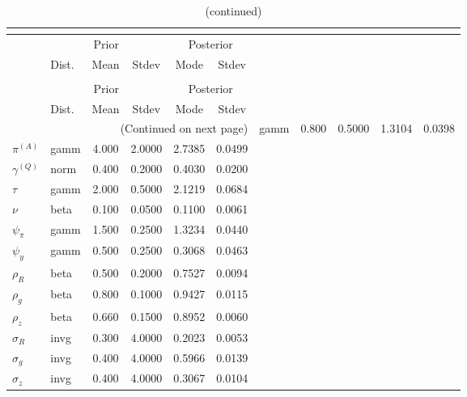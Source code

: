  
\begin{center}
\begin{longtable}{llcccc} 
\caption{Results from posterior maximization (parameters)}\\
 \label{Table:Posterior:1}\\
\toprule 
  & \multicolumn{3}{c}{Prior}  &  \multicolumn{2}{c}{Posterior} \\
  \cmidrule(r{.75em}){2-4} \cmidrule(r{.75em}){5-6}
  & Dist. & Mean  & Stdev & Mode & Stdev \\ 
\midrule \endfirsthead 
\caption{(continued)}\\
 \bottomrule 
  & \multicolumn{3}{c}{Prior}  &  \multicolumn{2}{c}{Posterior} \\
  \cmidrule(r{.75em}){2-4} \cmidrule(r{.75em}){5-6}
  & Dist. & Mean  & Stdev & Mode & Stdev \\ 
\midrule \endhead 
\bottomrule \multicolumn{6}{r}{(Continued on next page)}\endfoot 
\bottomrule\endlastfoot 
${r_{A}}$ & gamm &   0.800 & 0.5000 &   1.3104 &  0.0398 \\ 
${\pi^{(A)}}$ & gamm &   4.000 & 2.0000 &   2.7385 &  0.0499 \\ 
${\gamma^{(Q)}}$ & norm &   0.400 & 0.2000 &   0.4030 &  0.0200 \\ 
${\tau}$ & gamm &   2.000 & 0.5000 &   2.1219 &  0.0684 \\ 
${\nu}$ & beta &   0.100 & 0.0500 &   0.1100 &  0.0061 \\ 
${\psi_\pi}$ & gamm &   1.500 & 0.2500 &   1.3234 &  0.0440 \\ 
${\psi_y}$ & gamm &   0.500 & 0.2500 &   0.3068 &  0.0463 \\ 
${\rho_R}$ & beta &   0.500 & 0.2000 &   0.7527 &  0.0094 \\ 
${\rho_{g}}$ & beta &   0.800 & 0.1000 &   0.9427 &  0.0115 \\ 
${\rho_z}$ & beta &   0.660 & 0.1500 &   0.8952 &  0.0060 \\ 
${\sigma_R}$ & invg &   0.300 & 4.0000 &   0.2023 &  0.0053 \\ 
${\sigma_{g}}$ & invg &   0.400 & 4.0000 &   0.5966 &  0.0139 \\ 
${\sigma_z}$ & invg &   0.400 & 4.0000 &   0.3067 &  0.0104 \\ 
\end{longtable}
 \end{center}
